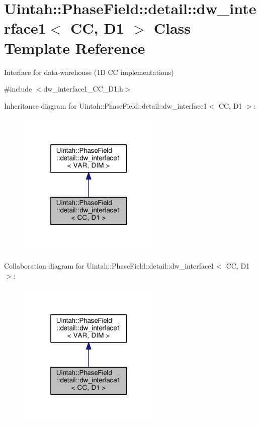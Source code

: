 \hypertarget{classUintah_1_1PhaseField_1_1detail_1_1dw__interface1_3_01CC_00_01D1_01_4}{}\section{Uintah\+:\+:Phase\+Field\+:\+:detail\+:\+:dw\+\_\+interface1$<$ CC, D1 $>$ Class Template Reference}
\label{classUintah_1_1PhaseField_1_1detail_1_1dw__interface1_3_01CC_00_01D1_01_4}


Interface for data-\/warehouse (1D CC implementations)  




{\ttfamily \#include $<$dw\+\_\+interface1\+\_\+\+C\+C\+\_\+\+D1.\+h$>$}



Inheritance diagram for Uintah\+:\+:Phase\+Field\+:\+:detail\+:\+:dw\+\_\+interface1$<$ CC, D1 $>$\+:\nopagebreak
\begin{figure}[H]
\begin{center}
\leavevmode
\includegraphics[width=193pt]{classUintah_1_1PhaseField_1_1detail_1_1dw__interface1_3_01CC_00_01D1_01_4__inherit__graph}
\end{center}
\end{figure}


Collaboration diagram for Uintah\+:\+:Phase\+Field\+:\+:detail\+:\+:dw\+\_\+interface1$<$ CC, D1 $>$\+:\nopagebreak
\begin{figure}[H]
\begin{center}
\leavevmode
\includegraphics[width=193pt]{classUintah_1_1PhaseField_1_1detail_1_1dw__interface1_3_01CC_00_01D1_01_4__coll__graph}
\end{center}
\end{figure}
